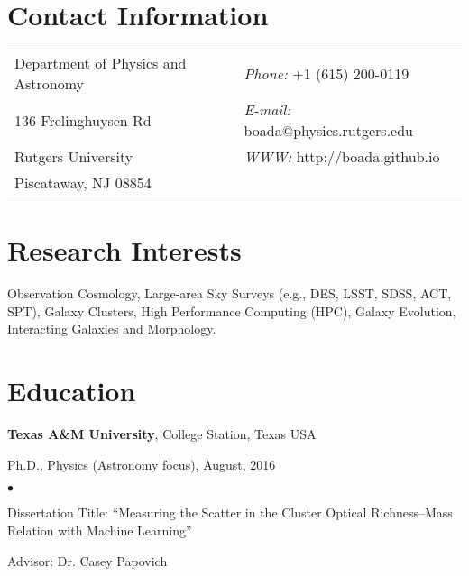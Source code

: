 \documentclass[margin,line, 11pt]{res}
\newenvironment{list1}{
  \begin{list}{\ding{113}}{%
      \setlength{\itemsep}{0in}
      \setlength{\parsep}{0in} \setlength{\parskip}{0in}
      \setlength{\topsep}{0in} \setlength{\partopsep}{0in} 
      \setlength{\leftmargin}{0.17in}}}{\end{list}}
\newenvironment{list2}{
  \begin{list}{$\bullet$}{%
      \setlength{\itemsep}{0in}
      \setlength{\parsep}{0in} \setlength{\parskip}{0in}
      \setlength{\topsep}{0in} \setlength{\partopsep}{0in} 
      \setlength{\leftmargin}{0.2in}}}{\end{list}}
\begin{document}

\begin{resume}
\section{\sc Contact Information}
\vspace{.05in}
\begin{tabular}{@{}p{3in}p{3in}}
Department of Physics and Astronomy & {\it Phone:}  +1 (615) 200-0119 \\            
136 Frelinghuysen Rd   & {\it E-mail:}  boada@physics.rutgers.edu \\         
Rutgers University & {\it WWW:} http://boada.github.io \\       
Piscataway, NJ 08854  & \\     
\end{tabular}

\section{\sc Research Interests}
Observation Cosmology, Large-area Sky Surveys (e.g., DES, LSST, SDSS, ACT, SPT), Galaxy Clusters, High Performance Computing (HPC), Galaxy Evolution, Interacting Galaxies and Morphology.
\vspace*{-3mm}

\section{\sc Education}
\textbf{Texas A\&M University}, College Station, Texas USA\\
\vspace*{-.1in}
\begin{list1}
    \item[]Ph.D., Physics (Astronomy focus), August, 2016
    \begin{list2}
        \item Dissertation Title: ``Measuring the Scatter in the Cluster Optical Richness--Mass\\ Relation with Machine Learning'' 
        \item Advisor: Dr. Casey Papovich
    \end{list2}
\end{list1}
\vspace*{1mm}


\end{resume}
\end{document}
